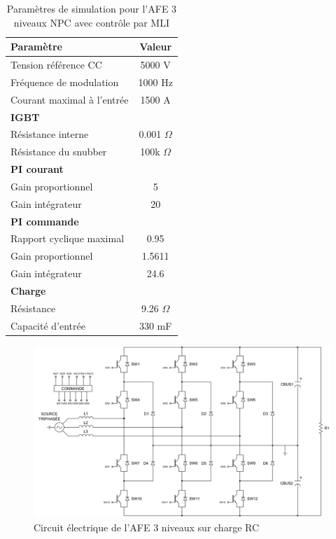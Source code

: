 \begin{table}[htb]
\centering
\begin{tabular}{|l|c|} 
  \hline
  \textbf{Paramètre} & \textbf{Valeur}  \\
  \hline\hline
  Tension référence CC & 5000 V\\ \hline
  Fréquence de modulation & 1000 Hz \\ \hline
  Courant maximal à l'entrée& 1500 A \\ \hline \hline
  \multicolumn{2}{|l|}{\textbf{IGBT}}\\ \hline
  Résistance interne & 0.001 $\Omega$\\
  Résistance du snubber & 100k $\Omega$\\ \hline \hline
   \multicolumn{2}{|l|}{\textbf{PI courant}}\\ \hline
  Gain proportionnel & 5 \\
  Gain intégrateur & 20 \\ \hline \hline
  \multicolumn{2}{|l|}{\textbf{PI commande}}\\ \hline
  Rapport cyclique maximal & 0.95\\
  Gain proportionnel & 1.5611 \\
  Gain intégrateur & 24.6 \\ \hline \hline
  \multicolumn{2}{|l|}{\textbf{Charge}}\\ \hline
  Résistance & 9.26 $\Omega$ \\
  Capacité d'entrée & 330 mF\\
  \hline
\end{tabular}
\caption{Paramètres de simulation pour l'AFE 3 niveaux NPC avec contrôle par MLI}
\label{p_AF_3level}
\end{table}

\begin{figure}[htb]
\centering
\includegraphics[scale=0.6]{fig/AFE_3L_RC.png}
\caption{Circuit électrique de l'AFE 3 niveaux sur charge RC}
\label{circuit_AFE_3L_RC}
\end{figure}


